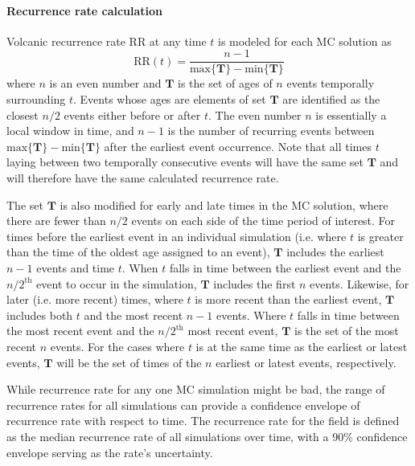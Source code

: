 \documentclass[12pt,letter]{article}
\begin{document}
\paragraph{Recurrence rate calculation} Volcanic recurrence rate RR at any time $t$ is modeled for each MC solution as
\begin{equation}
\text{RR}(t) = \frac{n-1}{\text{max}\{\mathbf{T}\} - \text{min}\{\mathbf{T}\}}
\label{eq_RR}
\end{equation}
where $n$ is an even number and $\mathbf{T}$ is the set of ages of $n$ events temporally surrounding $t$. Events whose ages are elements of set $\mathbf{T}$ are identified as the closest $n/2$ events either before or after $t$. The even number $n$ is essentially a local window in time, and $n-1$ is the number of recurring events between $\text{max}\{\mathbf{T}\}-\text{min}\{\mathbf{T}\}$ after the earliest event occurrence. Note that all times $t$ laying between two temporally consecutive events will have the same set $\mathbf{T}$ and will therefore have the same calculated recurrence rate.

The set $\mathbf{T}$ is also modified for early and late times in the MC solution, where there are fewer than $n/2$ events on each side of the time period of interest. For times before the earliest event in an individual simulation (i.e. where $t$ is greater than the time of the oldest age assigned to an event), $\mathbf{T}$ includes the earliest $n-1$ events and time $t$. When $t$ falls in time between the earliest event and the $n/2^{\text{th}}$ event to occur in the simulation, $\mathbf{T}$ includes the first $n$ events. Likewise, for later (i.e. more recent) times, where $t$ is more recent than the earliest event, $\mathbf{T}$ includes both $t$ and the most recent $n-1$ events. Where $t$ falls in time between the most recent event and the $n/2^{\text{th}}$ most recent event, $\mathbf{T}$ is the set of the most recent $n$ events. For the cases where $t$ is at the same time as the earliest or latest events, $\mathbf{T}$ will be the set of times of the $n$ earliest or latest events, respectively.

While recurrence rate for any one MC simulation might be bad, the range of recurrence rates for all simulations can provide a confidence envelope of recurrence rate with respect to time. The recurrence rate for the field is defined as the median recurrence rate of all simulations over time, with a 90\% confidence envelope serving as the rate's uncertainty.
\end{document}
